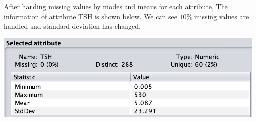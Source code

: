 \documentclass{article}
\begin{document}
After handing missing values by modes and means for each attribute, The information of attribute TSH is shown below. We can see $10\%$ missing values are handled and standard deviation has changed.

\smallskip

\includegraphics[scale=0.5]{tsh_missing.png}
\end{document}

